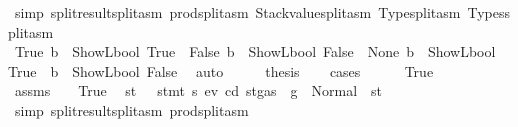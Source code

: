 \begin{isabellebody}
\ {\isacharparenleft}{\kern0pt}simp\ split{\isacharcolon}{\kern0pt}result{\isachardot}{\kern0pt}split{\isacharunderscore}{\kern0pt}asm\ prod{\isachardot}{\kern0pt}split{\isacharunderscore}{\kern0pt}asm\ Stackvalue{\isachardot}{\kern0pt}split{\isacharunderscore}{\kern0pt}asm\ Type{\isachardot}{\kern0pt}split{\isacharunderscore}{\kern0pt}asm\ Types{\isachardot}{\kern0pt}split{\isacharunderscore}{\kern0pt}asm{\isacharparenright}{\kern0pt}\isanewline
\ \ \isamarkupfalse%
\ \isamarkupfalse%
\ {\isacharparenleft}{\kern0pt}True{\isacharparenright}{\kern0pt}\ {\isachardoublequoteopen}b\ {\isacharequal}{\kern0pt}\ ShowL\isactrlsub b\isactrlsub o\isactrlsub o\isactrlsub l\ True{\isachardoublequoteclose}\ {\isacharbar}{\kern0pt}\ {\isacharparenleft}{\kern0pt}False{\isacharparenright}{\kern0pt}\ {\isachardoublequoteopen}b\ {\isacharequal}{\kern0pt}\ ShowL\isactrlsub b\isactrlsub o\isactrlsub o\isactrlsub l\ False{\isachardoublequoteclose}\ {\isacharbar}{\kern0pt}\ {\isacharparenleft}{\kern0pt}None{\isacharparenright}{\kern0pt}\ {\isachardoublequoteopen}b\ {\isasymnoteq}\ ShowL\isactrlsub b\isactrlsub o\isactrlsub o\isactrlsub l\ True\ {\isasymand}\ b\ {\isasymnoteq}\ ShowL\isactrlsub b\isactrlsub o\isactrlsub o\isactrlsub l\ False{\isachardoublequoteclose}\ \isamarkupfalse%
\ auto\isanewline
\ \ \isamarkupfalse%
\ \isamarkupfalse%
\ {\isacharquery}{\kern0pt}thesis\isanewline
\ \ \isamarkupfalse%
\ cases\isanewline
\ \ \ \ \isamarkupfalse%
\ True\isanewline
\ \ \ \ \isamarkupfalse%
\ \isamarkupfalse%
\ assms\ {}\ {}\ {}\ True\ \isamarkupfalse%
\ st{\isacharprime}{\kern0pt}\ \ {}{\isacharcolon}{\kern0pt}\ {\isachardoublequoteopen}stmt\ s{}\ ev\ cd\ {\isacharparenleft}{\kern0pt}st{\isasymlparr}gas\ {\isacharcolon}{\kern0pt}{\isacharequal}{\kern0pt}\ g{\isasymrparr}{\isacharparenright}{\kern0pt}\ {\isacharequal}{\kern0pt}\ Normal\ {\isacharparenleft}{\kern0pt}{\isacharparenleft}{\kern0pt}{\isacharparenright}{\kern0pt}{\isacharcomma}{\kern0pt}\ st{\isacharprime}{\kern0pt}{\isacharparenright}{\kern0pt}{\isachardoublequoteclose}\ \isamarkupfalse%
\ {\isacharparenleft}{\kern0pt}simp\ split{\isacharcolon}{\kern0pt}result{\isachardot}{\kern0pt}split{\isacharunderscore}{\kern0pt}asm\ prod{\isachardot}{\kern0pt}split{\isacharunderscore}{\kern0pt}asm{\isacharparenright}{\kern0pt}\isanewline
\ \ \ \ \isamarkupfalse%

\end{isabellebody}
